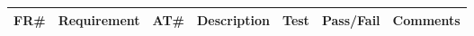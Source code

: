 \begin{longtable}{ |l|p{3cm}|l|p{5cm}|p{5cm}|l|p{6.5cm}|}
\hline
\textbf{FR\#}	&	\textbf{Requirement} & \textbf{AT\#}	&	\textbf{Description} & \textbf{Test} & \textbf{Pass/Fail} &	\textbf{Comments} \\
\hline
\endhead



\end{longtable}